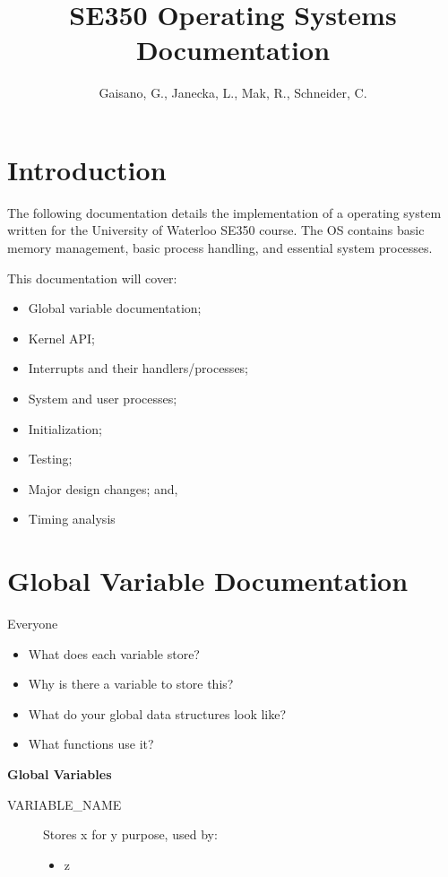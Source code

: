\documentclass[11pt, oneside]{article}
\title{SE350 Operating Systems Documentation}
\author{Gaisano, G., Janecka, L., Mak, R., Schneider, C.}
\begin{document}
\maketitle

\section{Introduction}
The following documentation details the implementation of a operating system written for the University of Waterloo SE350 course. The OS contains basic memory management, basic process handling, and essential system processes.

This documentation will cover:
\begin{itemize}
\item Global variable documentation;
\item Kernel API;
\item Interrupts and their handlers/processes;
\item System and user processes;
\item Initialization;
\item Testing;
\item Major design changes; and,
\item Timing analysis
\end{itemize}

\clearpage
\section{Global Variable Documentation}
Everyone
\begin{itemize}
\item What does each variable store?
\item Why is there a variable to store this?
\item What do your global data structures look like?
\item What functions use it?
\end{itemize}

{\bf Global Variables}
\begin{description}
\item [VARIABLE\_NAME] Stores x for y purpose, used by:
\begin{itemize}
\item z
\end{itemize}
\end{description}
\end{document}
